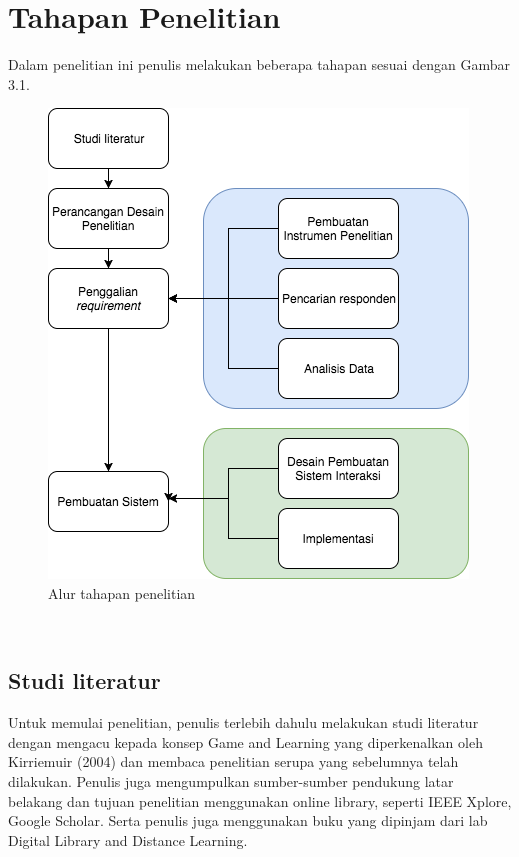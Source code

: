 \section{Tahapan Penelitian}

Dalam penelitian ini penulis melakukan beberapa tahapan sesuai dengan Gambar 3.1.

\begin{figure}
	\includegraphics{pics/flow-pembuatan}
	\caption{Alur tahapan penelitian}
	\centering
\end{figure}
\

	\subsection{Studi literatur}
	
	Untuk memulai penelitian, penulis terlebih dahulu melakukan studi literatur dengan
	mengacu kepada konsep Game and Learning yang
	diperkenalkan oleh Kirriemuir (2004) dan membaca penelitian serupa yang sebelumnya telah dilakukan. Penulis juga mengumpulkan sumber-sumber pendukung latar belakang dan tujuan penelitian menggunakan online library, seperti IEEE Xplore, Google Scholar. Serta penulis juga menggunakan buku yang dipinjam dari lab Digital Library and Distance Learning.
	
